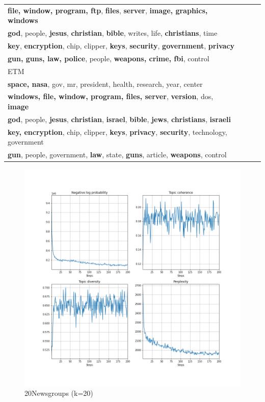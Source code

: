 \begin{table}[ht]
\begin{tabular}{llll}
\textbf{file, window, program, ftp}, \textbf{files}, \textbf{server}, \textbf{image, graphics, windows}\\
\textbf{god}, people, \textbf{jesus}, \textbf{christian}, \textbf{bible}, writes, life, \textbf{christians}, time\\
\textbf{key}, \textbf{encryption}, chip, clipper, \textbf{keys}, \textbf{security}, \textbf{government}, \textbf{privacy}\\
\textbf{gun, guns, law, police}, people, \textbf{weapons, crime, fbi}, control
\\ \hline
\hline
ETM  \\ \hline
\textbf{space, nasa}, gov, mr, president, health, research, year, center\\
\textbf{windows, file, window, program, files, server}, \textbf{version}, dos, \textbf{image}\\
\textbf{god}, people, \textbf{jesus}, \textbf{christian}, \textbf{israel}, \textbf{bible}, \textbf{jews}, \textbf{christians}, \textbf{israeli}\\
\textbf{key, encryption}, chip, clipper, \textbf{keys}, \textbf{privacy}, \textbf{security}, technology, government\\
\textbf{gun}, people, government, \textbf{law}, state, \textbf{guns}, article, \textbf{weapons}, control
\\ \hline
\end{tabular}
\end{table}
\begin{figure}
\centering
\includegraphics[width=1\linewidth]{figures/0106/ppl_20t}
\caption{20Newsgroups (k=20)}
\label{fig:ppl20t}
\end{figure}
